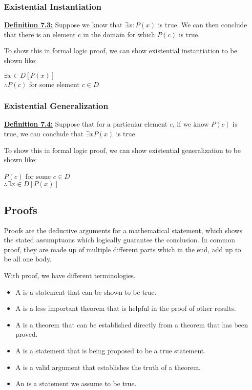 \subsubsection{Existential Instantiation}
\textbf{\underline{Definition 7.3:}} Suppose we know that $\exists x: P(x)$ is true. We can then conclude that there is an element c in the domain for which $P(c)$ is true.

To show this in formal logic proof, we can show existential instantiation to be shown like:

\begin{center}
    $\exists x \in D[P(x)]$\\
    $\therefore P(c)$ for some element $c \in D$
\end{center}

\subsubsection{Existential Generalization}
\textbf{\underline{Definition 7.4:}} Suppose that for a particular element c, if we know $P(c)$ is true, we can conclude that $\exists x P(x)$ is true.

To show this in formal logic proof, we can show existential generalization to be shown like:

\begin{center}
    $P(c)$ for some $c \in D$\\
    $\therefore \exists x \in D[P(x)]$
\end{center}

\subsection{Proofs}
Proofs are the deductive arguments for a mathematical statement, which shows the stated assumptuons which logically guarantee the conclusion. In common proof, they are made up of multiple different parts which in the end, add up to be all one body.

With proof, we have different terminologies.

\begin{itemize}
    \item A  is a statement that can be shown to be true.
    \item A  is a less important theorem that is helpful in the proof of other results.
    \item A  is a theorem that can be established directly from a theorem that has been proved.
    \item A  is a statement that is being proposed to be a true statement.
    \item A  is a valid argument that establishes the truth of a theorem.
    \item An  is a statement we assume to be true.
\end{itemize}

